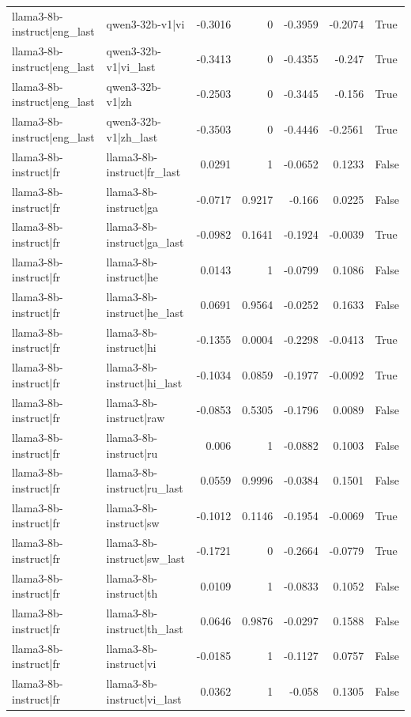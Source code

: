 \begin{table}
\begin{tabular}{l l r r r r l}
llama3-8b-instruct|eng_last & qwen3-32b-v1|vi & -0.3016 & 0 & -0.3959 & -0.2074 & True \\
llama3-8b-instruct|eng_last & qwen3-32b-v1|vi_last & -0.3413 & 0 & -0.4355 & -0.247 & True \\
llama3-8b-instruct|eng_last & qwen3-32b-v1|zh & -0.2503 & 0 & -0.3445 & -0.156 & True \\
llama3-8b-instruct|eng_last & qwen3-32b-v1|zh_last & -0.3503 & 0 & -0.4446 & -0.2561 & True \\
llama3-8b-instruct|fr & llama3-8b-instruct|fr_last & 0.0291 & 1 & -0.0652 & 0.1233 & False \\
llama3-8b-instruct|fr & llama3-8b-instruct|ga & -0.0717 & 0.9217 & -0.166 & 0.0225 & False \\
llama3-8b-instruct|fr & llama3-8b-instruct|ga_last & -0.0982 & 0.1641 & -0.1924 & -0.0039 & True \\
llama3-8b-instruct|fr & llama3-8b-instruct|he & 0.0143 & 1 & -0.0799 & 0.1086 & False \\
llama3-8b-instruct|fr & llama3-8b-instruct|he_last & 0.0691 & 0.9564 & -0.0252 & 0.1633 & False \\
llama3-8b-instruct|fr & llama3-8b-instruct|hi & -0.1355 & 0.0004 & -0.2298 & -0.0413 & True \\
llama3-8b-instruct|fr & llama3-8b-instruct|hi_last & -0.1034 & 0.0859 & -0.1977 & -0.0092 & True \\
llama3-8b-instruct|fr & llama3-8b-instruct|raw & -0.0853 & 0.5305 & -0.1796 & 0.0089 & False \\
llama3-8b-instruct|fr & llama3-8b-instruct|ru & 0.006 & 1 & -0.0882 & 0.1003 & False \\
llama3-8b-instruct|fr & llama3-8b-instruct|ru_last & 0.0559 & 0.9996 & -0.0384 & 0.1501 & False \\
llama3-8b-instruct|fr & llama3-8b-instruct|sw & -0.1012 & 0.1146 & -0.1954 & -0.0069 & True \\
llama3-8b-instruct|fr & llama3-8b-instruct|sw_last & -0.1721 & 0 & -0.2664 & -0.0779 & True \\
llama3-8b-instruct|fr & llama3-8b-instruct|th & 0.0109 & 1 & -0.0833 & 0.1052 & False \\
llama3-8b-instruct|fr & llama3-8b-instruct|th_last & 0.0646 & 0.9876 & -0.0297 & 0.1588 & False \\
llama3-8b-instruct|fr & llama3-8b-instruct|vi & -0.0185 & 1 & -0.1127 & 0.0757 & False \\
llama3-8b-instruct|fr & llama3-8b-instruct|vi_last & 0.0362 & 1 & -0.058 & 0.1305 & False \\

\end{tabular}
\end{table}
